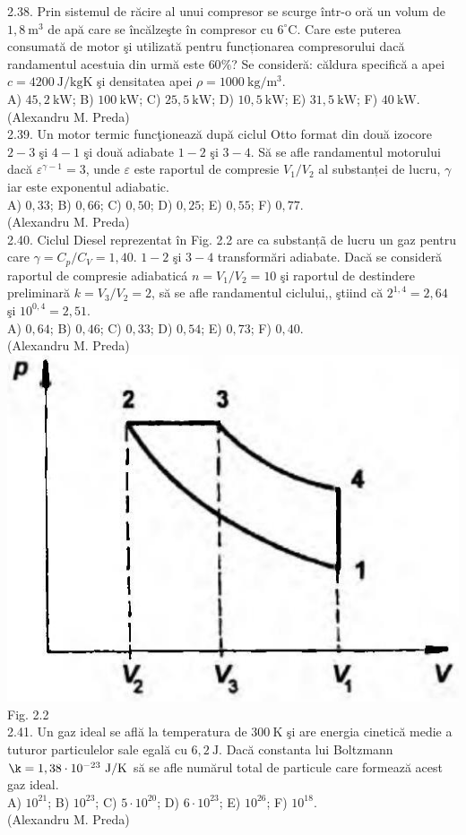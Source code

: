 2.38. Prin sistemul de răcire al unui compresor se scurge într-o oră un volum de $1,8 \mathrm{~m}^{3}$ de apă care se încălzeşte în compresor cu $6^{\circ} \mathrm{C}$. Care este puterea consumată de motor şi utilizată pentru funcționarea compresorului dacă randamentul acestuia din urmă este $60 \%$? Se consideră: căldura specifică a apei $c=4200 \mathrm{~J} / \mathrm{kgK}$ şi densitatea apei $\rho=1000 \mathrm{~kg} / \mathrm{m}^{3}$.\\ A) $45,2 \mathrm{~kW}$; B) $100 \mathrm{~kW}$; C) $25,5 \mathrm{~kW}$; D) $10,5 \mathrm{~kW}$; E) $31,5 \mathrm{~kW}$; F) $40 \mathrm{~kW}$.\\ (Alexandru M. Preda)\\

2.39. Un motor termic funcţionează după ciclul Otto format din două izocore $2-3$ şi $4-1$ şi două adiabate $1-2$ şi $3-4$. Să se afle randamentul motorului dacă $\varepsilon^{\gamma-1}=3$, unde $\varepsilon$ este raportul de compresie $V_{1} / V_{2}$ al substanței de lucru, $\gamma$ iar este exponentul adiabatic.\\ A) $0,33$; B) $0,66$; C) $0,50$; D) $0,25$; E) $0,55$; F) $0,77$.\\ (Alexandru M. Preda)\\

2.40. Ciclul Diesel reprezentat în Fig. 2.2 are ca substanțã de lucru un gaz pentru care $\gamma=C_{p} / C_{V}=1,40$. $1-2$ şi $3-4$ transformări adiabate. Dacă se consideră raportul de compresie adiabaticá $n=V_{1} / V_{2}=10$ şi raportul de destindere preliminară $k=V_{3} / V_{2}=2$, să se afle randamentul ciclului,, ştiind că $2^{1,4}=2,64$ şi $10^{0,4}=2,51$.\\ A) $0,64$; B) $0,46$; C) $0,33$; D) $0,54$; E) $0,73$; F) $0,40$.\\ (Alexandru M. Preda)\\ \includegraphics[width=0.4\linewidth]{images/2025_07_01_5b3ff9fa0d508c8e9f17g-081} Fig. 2.2\\

2.41. Un gaz ideal se află la temperatura de $300 \mathrm{~K}$ şi are energia cinetică medie a tuturor particulelor sale egală cu $6,2 \mathrm{~J}$. Dacă constanta lui Boltzmann $\k=1,38 \cdot 10^{-23} \mathrm{~J} / \mathrm{K}$ să se afle numărul total de particule care formează acest gaz ideal.\\ A) $10^{21}$; B) $10^{23}$; C) $5 \cdot 10^{20}$; D) $6 \cdot 10^{23}$; E) $10^{26}$; F) $10^{18}$.\\ (Alexandru M. Preda)\\

